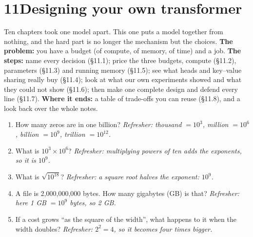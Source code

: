 \newpage
\section*{11\quad Designing your own transformer}
\providecommand{\nElevenFit}[1]{\setbox0\hbox{#1}\ifdim\wd0>\linewidth\resizebox{\linewidth}{!}{\usebox0}\else\usebox0\fi}

\begin{chaptermap}
Ten chapters took one model apart. This one puts a model together from nothing, and the hard part is no
longer the mechanism but the choices. \textbf{The problem:} you have a budget (of compute, of memory, of
time) and a job. \textbf{The steps:} name every decision (\S11.1); price the three budgets, compute
(\S11.2), parameters (\S11.3) and running memory (\S11.5); see what heads and key--value sharing really
buy (\S11.4); look at what our own experiments showed and what they could not show (\S11.6); then make
one complete design and defend every line (\S11.7). \textbf{Where it ends:} a table of trade-offs you can
reuse (\S11.8), and a look back over the whole notes.
\end{chaptermap}


\begin{beforeyoustart}
\begin{enumerate}[label=\arabic*.,leftmargin=1.6em]
\item How many zeros are in one billion? \emph{Refresher: thousand $=10^3$, million $=10^6$,
billion $=10^9$, trillion $=10^{12}$.}
\item What is $10^{3}\times10^{6}$? \emph{Refresher: multiplying powers of ten adds the exponents, so it
is $10^{9}$.}
\item What is $\sqrt{10^{18}}$? \emph{Refresher: a square root halves the exponent: $10^{9}$.}
\item A file is 2{,}000{,}000{,}000 bytes. How many gigabytes (GB) is that? \emph{Refresher: here
1 GB $=10^9$ bytes, so 2 GB.}
\item If a cost grows ``as the square of the width'', what happens to it when the width doubles?
\emph{Refresher: $2^2=4$, so it becomes four times bigger.}
\end{enumerate}
\end{beforeyoustart}

